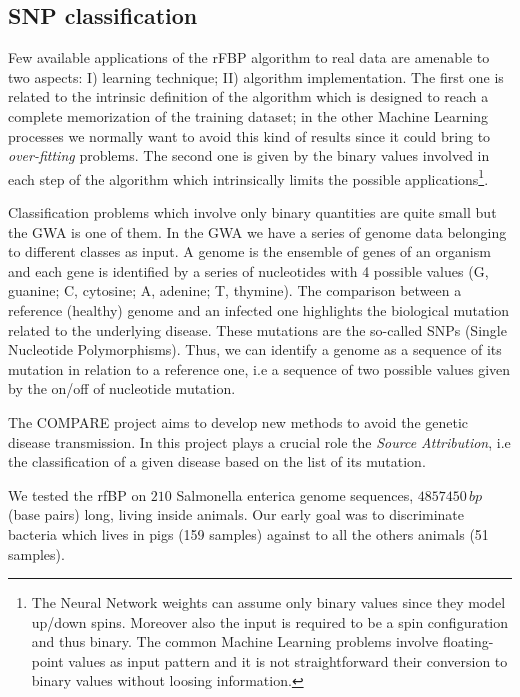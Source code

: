 \documentclass{standalone}
\begin{document}
\subsection[Compare dataset]{SNP classification}\label{rfbp:snp}

Few available applications of the rFBP algorithm to real data are amenable to two aspects: I) learning technique; II) algorithm implementation.
The first one is related to the intrinsic definition of the algorithm which is designed to reach a complete memorization of the training dataset; in the other Machine Learning processes we normally want to avoid this kind of results since it could bring to \emph{over-fitting} problems.
The second one is given by the binary values involved in each step of the algorithm which intrinsically limits the possible applications\footnote{
  The Neural Network weights can assume only binary values since they model up/down spins.
  Moreover also the input is required to be a spin configuration and thus binary.
  The common Machine Learning problems involve floating-point values as input pattern and it is not straightforward their conversion to binary values without loosing information.
}.

Classification problems which involve only binary quantities are quite small but the GWA is one of them.
In the GWA we have a series of genome data belonging to different classes as input.
A genome is the ensemble of genes of an organism and each gene is identified by a series of nucleotides with 4 possible values (G, guanine; C, cytosine; A, adenine; T, thymine).
The comparison between a reference (healthy) genome and an infected one highlights the biological mutation related to the underlying disease.
These mutations are the so-called SNPs (Single Nucleotide Polymorphisms).
Thus, we can identify a genome as a sequence of its mutation in relation to a reference one, i.e a sequence of two possible values given by the on/off of nucleotide mutation.

The COMPARE project aims to develop new methods to avoid the genetic disease transmission.
In this project plays a crucial role the \emph{Source Attribution}, i.e the classification of a given disease based on the list of its mutation.

We tested the rfBP on $210$ Salmonella enterica genome sequences, $4857450\,bp$ (base pairs) long, living inside animals.
Our early goal was to discriminate bacteria which lives in pigs (159 samples) against to all the others animals (51 samples).
\end{document}
